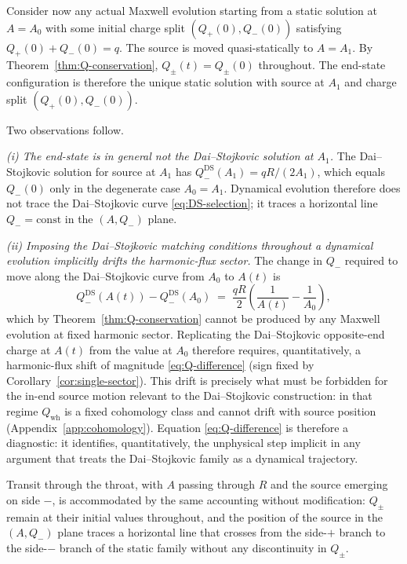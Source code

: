 \documentclass[aps,prd,onecolumn,nofootinbib,superscriptaddress]{revtex4-2}
\begin{document}
Consider now any actual Maxwell evolution starting from a static solution at $A=A_0$ with some initial charge split $(Q_+(0),Q_-(0))$ satisfying $Q_+(0)+Q_-(0)=q$. The source is moved quasi-statically to $A=A_1$. By Theorem~\ref{thm:Q-conservation}, $Q_\pm(t)=Q_\pm(0)$ throughout. The end-state configuration is therefore the unique static solution with source at $A_1$ and charge split $(Q_+(0),Q_-(0))$.

Two observations follow.

\emph{(i) The end-state is in general not the Dai--Stojkovic solution at $A_1$.} The Dai--Stojkovic solution for source at $A_1$ has $Q_-^{\mathrm{DS}}(A_1) = qR/(2A_1)$, which equals $Q_-(0)$ only in the degenerate case $A_0=A_1$. Dynamical evolution therefore does not trace the Dai--Stojkovic curve \eqref{eq:DS-selection}; it traces a horizontal line $Q_- = \mathrm{const}$ in the $(A,Q_-)$ plane.

\emph{(ii) Imposing the Dai--Stojkovic matching conditions throughout a dynamical evolution implicitly drifts the harmonic-flux sector.} The change in $Q_-$ required to move along the Dai--Stojkovic curve from $A_0$ to $A(t)$ is
\begin{equation}
\label{eq:Q-difference}
Q_-^{\mathrm{DS}}(A(t)) - Q_-^{\mathrm{DS}}(A_0) \;=\; \frac{qR}{2}\!\left(\frac{1}{A(t)}-\frac{1}{A_0}\right),
\end{equation}
which by Theorem~\ref{thm:Q-conservation} cannot be produced by any Maxwell evolution at fixed harmonic sector. Replicating the Dai--Stojkovic opposite-end charge at $A(t)$ from the value at $A_0$ therefore requires, quantitatively, a harmonic-flux shift of magnitude \eqref{eq:Q-difference} (sign fixed by Corollary~\ref{cor:single-sector}). This drift is precisely what must be forbidden for the in-end source motion relevant to the Dai--Stojkovic construction: in that regime $Q_{\mathrm{wh}}$ is a fixed cohomology class and cannot drift with source position (Appendix~\ref{app:cohomology}). Equation \eqref{eq:Q-difference} is therefore a diagnostic: it identifies, quantitatively, the unphysical step implicit in any argument that treats the Dai--Stojkovic family as a dynamical trajectory.

Transit through the throat, with $A$ passing through $R$ and the source emerging on side $-$, is accommodated by the same accounting without modification: $Q_\pm$ remain at their initial values throughout, and the position of the source in the $(A,Q_-)$ plane traces a horizontal line that crosses from the side-$+$ branch to the side-$-$ branch of the static family without any discontinuity in $Q_\pm$.



\end{document}
